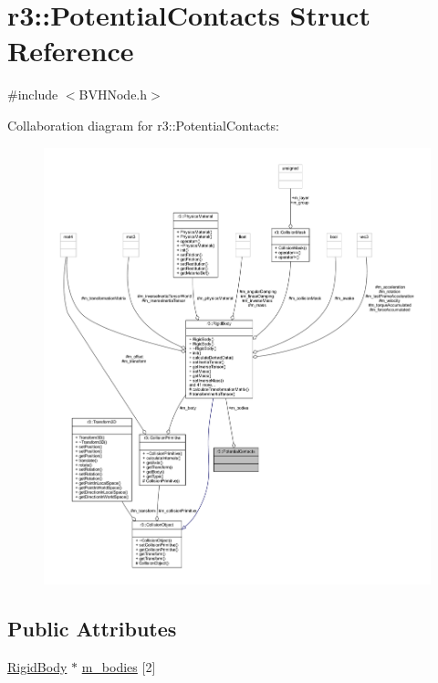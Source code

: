 \hypertarget{structr3_1_1_potential_contacts}{}\section{r3\+:\+:Potential\+Contacts Struct Reference}
\label{structr3_1_1_potential_contacts}


{\ttfamily \#include $<$B\+V\+H\+Node.\+h$>$}



Collaboration diagram for r3\+:\+:Potential\+Contacts\+:\nopagebreak
\begin{figure}[H]
\begin{center}
\leavevmode
\includegraphics[width=350pt]{structr3_1_1_potential_contacts__coll__graph}
\end{center}
\end{figure}
\subsection*{Public Attributes}
\begin{DoxyCompactItemize}
\item 
\mbox{\hyperlink{classr3_1_1_rigid_body}{Rigid\+Body}} $\ast$ \mbox{\hyperlink{structr3_1_1_potential_contacts_abe9023b80e8adb82b9e2e0cb65527b3b}{m\+\_\+bodies}} \mbox{[}2\mbox{]}
\end{DoxyCompactItemize}


